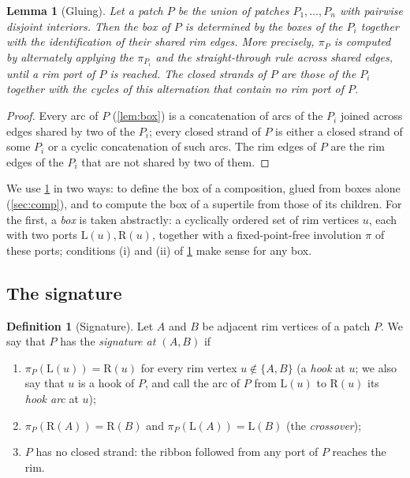 \documentclass[11pt]{amsart}
\newtheorem{lemma}[theorem]{Lemma}
\theoremstyle{definition}
\newtheorem{definition}[theorem]{Definition}
\theoremstyle{remark}
\newcommand{\Lp}{\mathrm L}
\newcommand{\Rp}{\mathrm R}
\begin{document}
\begin{lemma}[Gluing]\label{lem:gluing}
Let a patch $P$ be the union of patches $P_1,\dots,P_n$ with pairwise disjoint interiors. Then the box of $P$ is
determined by the boxes of the $P_i$ together with the identification of their shared rim edges. More precisely,
$\pi_P$ is computed by alternately applying the $\pi_{P_i}$ and the straight-through rule across shared edges, until a
rim port of $P$ is reached. The closed strands of $P$ are those of the $P_i$ together with the cycles of this
alternation that contain no rim port of $P$.
\end{lemma}

\begin{proof}
Every arc of $P$ (\cref{lem:box}) is a concatenation of arcs of the $P_i$ joined across edges shared by two of the
$P_i$; every closed strand of $P$ is either a closed strand of some $P_i$ or a cyclic concatenation of such arcs. The rim
edges of $P$ are the rim edges of the $P_i$ that are not shared by two of them.
\end{proof}

We use \cref{lem:gluing} in two ways: to define the box of a composition, glued from boxes alone (\cref{sec:comp}), and
to compute the box of a supertile from those of its children. For the first, a \emph{box} is taken abstractly: a
cyclically ordered set of rim vertices $u$, each with two ports $\Lp(u),\Rp(u)$, together with a fixed-point-free
involution $\pi$ of these ports; conditions (i) and (ii) of \cref{def:signature} make sense for any box.

\subsection{The signature}
\begin{definition}[Signature]\label{def:signature}
Let $A$ and $B$ be adjacent rim vertices of a patch $P$. We say that $P$ has the \emph{signature at $(A,B)$} if
\begin{enumerate}[label=(\roman*)]
\item $\pi_P(\Lp(u))=\Rp(u)$ for every rim vertex $u\notin\{A,B\}$ (a \emph{hook} at $u$; we also say that $u$ is a
hook of $P$, and call the arc of $P$ from $\Lp(u)$ to $\Rp(u)$ its \emph{hook arc} at $u$);
\item $\pi_P(\Rp(A))=\Rp(B)$ and $\pi_P(\Lp(A))=\Lp(B)$ (the \emph{crossover});
\item $P$ has no closed strand: the ribbon followed from any port of $P$ reaches the rim.
\end{enumerate}
\end{definition}
\end{document}
